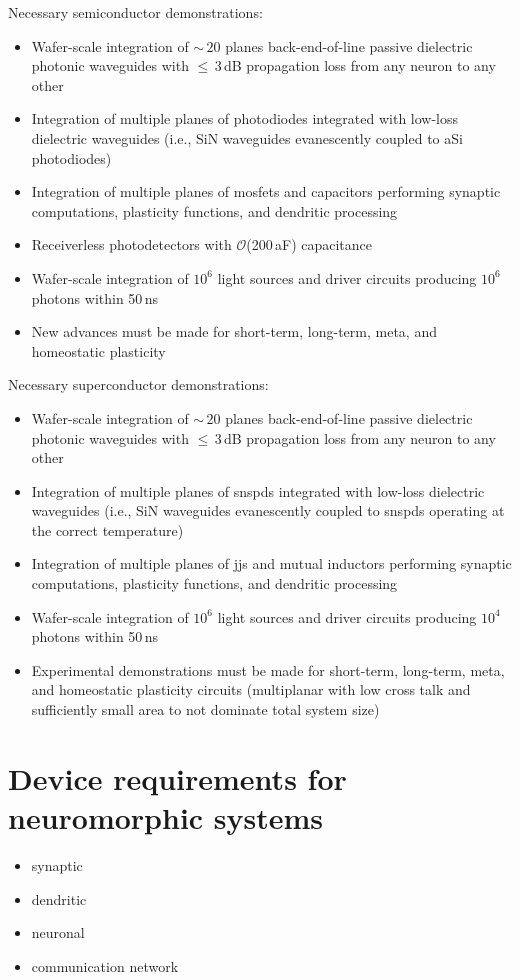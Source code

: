 \documentclass[onecolumn]{article}
\begin{document}
Necessary semiconductor demonstrations:
\begin{itemize}
\item Wafer-scale integration of $\sim\,20$ planes back-end-of-line passive dielectric photonic waveguides with $\le\,3$\,dB propagation loss from any neuron to any other
\item Integration of multiple planes of photodiodes integrated with low-loss dielectric waveguides (i.e., SiN waveguides evanescently coupled to aSi photodiodes)
\item Integration of multiple planes of mosfets and capacitors performing synaptic computations, plasticity functions, and dendritic processing
\item Receiverless photodetectors with $\mathcal{O}$(200\,aF) capacitance
\item Wafer-scale integration of $10^6$ light sources and driver circuits producing $10^6$ photons within 50\,ns
\item New advances must be made for short-term, long-term, meta, and homeostatic plasticity
\end{itemize}

\vspace{2em}
Necessary superconductor demonstrations:
\begin{itemize}
\item Wafer-scale integration of $\sim\,20$ planes back-end-of-line passive dielectric photonic waveguides with $\le\,3$\,dB propagation loss from any neuron to any other
\item Integration of multiple planes of snspds integrated with low-loss dielectric waveguides (i.e., SiN waveguides evanescently coupled to snspds operating at the correct temperature)
\item Integration of multiple planes of jjs and mutual inductors performing synaptic computations, plasticity functions, and dendritic processing
\item Wafer-scale integration of $10^6$ light sources and driver circuits producing $10^4$ photons within 50\,ns
\item Experimental demonstrations must be made for short-term, long-term, meta, and homeostatic plasticity circuits (multiplanar with low cross talk and sufficiently small area to not dominate total system size)
\end{itemize}



\section{\label{sec:neural_device_requirements}Device requirements for neuromorphic systems}
\begin{itemize}
\item synaptic
\item dendritic
\item neuronal
\item communication network
\end{itemize}
	
\end{document}
